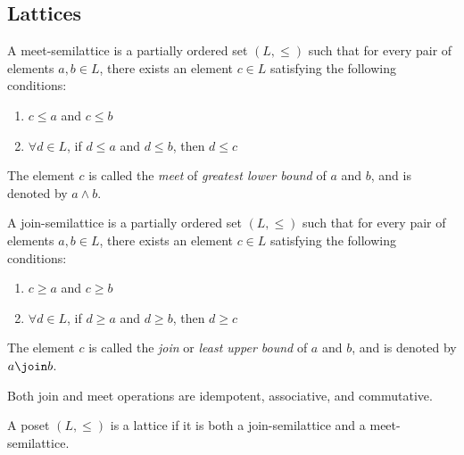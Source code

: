 \subsection{Lattices}

\begin{definition}
  A meet-semilattice is a partially ordered set \((L, \leq)\) such that for
  every pair of elements \(a, b \in L\), there exists an element \(c \in L\)
  satisfying the following conditions: 
  \begin{enumerate}
    \item \(c \leq a\) and \(c \leq b\) 
    \item \(\forall d \in L\), if \(d \leq a\) and \(d \leq b\), then \(d \leq c\) 
\end{enumerate}
  The element \(c\) is called the \emph{meet} of \emph{greatest lower bound} of
  \(a\) and \(b\), and is denoted by \(a \wedge b\).
\end{definition}

\begin{definition}
  A join-semilattice is a partially ordered set \((L, \leq)\) such that for
  every pair of elements \(a, b \in L\), there exists an element \(c \in L\)
  satisfying the following conditions: 
  \begin{enumerate}
    \item \(c \geq a\) and \(c \geq b\) 
    \item \(\forall d \in L\), if \(d \geq a\) and \(d \geq b\), then \(d \geq c\) 
\end{enumerate}
  The element \(c\) is called the \emph{join} or \emph{least upper bound} of
  \(a\) and \(b\), and is denoted by \(a \join b\).
\end{definition}

\begin{observation}
  Both join and meet operations are idempotent, associative, and commutative.
\end{observation}

\begin{definition}[Lattice]
  A poset $(L, \leq)$ is a lattice if it is both a join-semilattice and a 
  meet-semilattice.
\end{definition}

